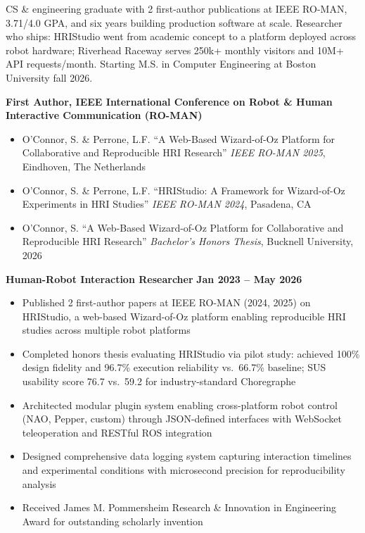 \documentclass{article}
\begin{document}



CS \& engineering graduate with 2 first-author publications at IEEE RO-MAN, 3.71/4.0 GPA, and six years building production software at scale. Researcher who ships: HRIStudio went from academic concept to a platform deployed across robot hardware; Riverhead Raceway serves 250k+ monthly visitors and 10M+ API requests/month. Starting M.S. in Computer Engineering at Boston University fall 2026.




\textbf{First Author, IEEE International Conference on Robot \& Human Interactive Communication (RO-MAN)}
\begin{itemize}[noitemsep,topsep=2pt]
    \item O'Connor, S. \& Perrone, L.F. ``A Web-Based Wizard-of-Oz Platform for Collaborative and Reproducible HRI Research'' \textit{IEEE RO-MAN 2025}, Eindhoven, The Netherlands
    \item O'Connor, S. \& Perrone, L.F. ``HRIStudio: A Framework for Wizard-of-Oz Experiments in HRI Studies'' \textit{IEEE RO-MAN 2024}, Pasadena, CA
    \item O'Connor, S. ``A Web-Based Wizard-of-Oz Platform for Collaborative and Reproducible HRI Research'' \textit{Bachelor's Honors Thesis}, Bucknell University, 2026
\end{itemize}


 \hfill {}

\textbf{Human-Robot Interaction Researcher} \hfill \textbf{Jan 2023 – May 2026}
\begin{itemize}[noitemsep,topsep=2pt]
    \item Published 2 first-author papers at IEEE RO-MAN (2024, 2025) on HRIStudio, a web-based Wizard-of-Oz platform enabling reproducible HRI studies across multiple robot platforms
    \item Completed honors thesis evaluating HRIStudio via pilot study: achieved 100\% design fidelity and 96.7\% execution reliability vs.\ 66.7\% baseline; SUS usability score 76.7 vs.\ 59.2 for industry-standard Choregraphe
    \item Architected modular plugin system enabling cross-platform robot control (NAO, Pepper, custom) through JSON-defined interfaces with WebSocket teleoperation and RESTful ROS integration
    \item Designed comprehensive data logging system capturing interaction timelines and experimental conditions with microsecond precision for reproducibility analysis
    \item Received James M. Pommersheim Research \& Innovation in Engineering Award for outstanding scholarly invention
\end{itemize}
\end{document}
